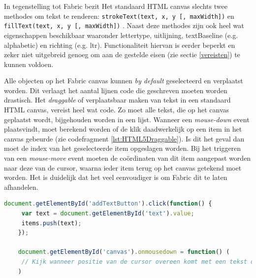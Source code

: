 In tegenstelling tot Fabric bezit Het standaard HTML canvas slechts twee methodes om tekst te renderen: \texttt{strokeText(text, x, y [, maxWidth])} en \texttt{fillText(text, x, y [, maxWidth])} \cite{MozillaCanvas-DrawingText}. 
Naast deze methodes zijn ook heel wat eigenschappen beschikbaar waaronder lettertype, uitlijning, textBaseline (e.g. alphabetic) en richting (e.g. ltr). Functionaliteit hiervan is eerder beperkt en zeker niet uitgebreid genoeg om aan de gestelde eisen (zie sectie \ref{vereisten}) te kunnen voldoen. 



Alle objecten op het Fabric canvas kunnen \textit{by default} geselecteerd en verplaatst worden. Dit verlaagt het aantal lijnen code die geschreven moeten worden drastisch. Het \textit{draggable} of verplaatsbaar maken van tekst in een standaard HTML canvas, vereist heel wat code. Zo moet alle tekst, die op het canvas geplaatst wordt, bijgehouden worden in een lijst. Wanneer een \textit{mouse-down} event plaatsvindt, moet berekend worden of de klik daadwerkelijk op een item in het canvas gebeurde (zie codefragment \ref{lst:HTML5Draggable}). Is dit het geval dan moet de index van het geselecteerde item opgeslagen worden. Bij het triggeren van een \textit{mouse-move} event moeten de co\"{o}rdinaten van dit item aangepast worden naar deze van de cursor, waarna ieder item terug op het canvas getekend moet worden. Het is duidelijk dat het veel eenvoudiger is om Fabric dit te laten afhandelen. 

\begin{lstlisting}[caption={Objecten verplaatsen in het standaard HTML5 canvas},label=lst:HTML5Draggable,language=javascript]
	document.getElementById('addTextButton').click(function() {
	 var text = document.getElementById('text').value;
	 items.push(text);
	});
	
	document.getElementById('canvas').onmousedown = function() (
	 // Kijk wanneer positie van de cursor overeen komt met een tekst object
	)
\end{lstlisting}

